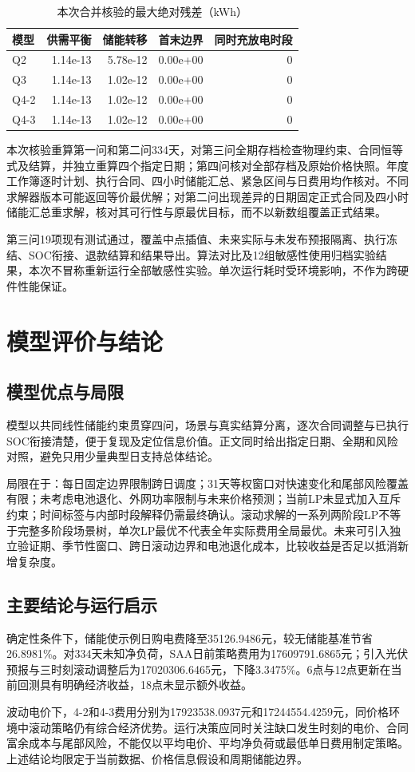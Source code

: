 \begin{table}[H]\centering\small
\caption{本次合并核验的最大绝对残差（kWh）}
\begin{tabular}{lrrrr}\toprule
模型 & 供需平衡 & 储能转移 & 首末边界 & 同时充放电时段\\\midrule
Q2 & 1.14e-13 & 5.78e-12 & 0.00e+00 & 0\\
Q3 & 1.14e-13 & 1.02e-12 & 0.00e+00 & 0\\
Q4-2 & 1.14e-13 & 1.02e-12 & 0.00e+00 & 0\\
Q4-3 & 1.14e-13 & 1.02e-12 & 0.00e+00 & 0\\
\bottomrule\end{tabular}\end{table}
本次核验重算第一问和第二问334天，对第三问全期存档检查物理约束、合同恒等式及结算，并独立重算四个指定日期；第四问核对全部存档及原始价格快照。年度工作簿逐时计划、执行合同、四小时储能汇总、紧急区间与日费用均作核对。不同求解器版本可能返回等价最优解；对第二问出现差异的日期固定正式合同及四小时储能汇总重求解，核对其可行性与原最优目标，而不以新数组覆盖正式结果。

第三问19项现有测试通过，覆盖中点插值、未来实际与未发布预报隔离、执行冻结、SOC衔接、退款结算和结果导出。算法对比及12组敏感性使用归档实验结果\cite{experiment}，本次不冒称重新运行全部敏感性实验。单次运行耗时受环境影响，不作为跨硬件性能保证。

\section{模型评价与结论}
\subsection{模型优点与局限}
模型以共同线性储能约束贯穿四问，场景与真实结算分离，逐次合同调整与已执行SOC衔接清楚，便于复现及定位信息价值。正文同时给出指定日期、全期和风险对照，避免只用少量典型日支持总体结论。

局限在于：每日固定边界限制跨日调度；31天等权窗口对快速变化和尾部风险覆盖有限；未考虑电池退化、外网功率限制与未来价格预测；当前LP未显式加入互斥约束；时间标签与内部时段解释仍需最终确认。滚动求解的一系列两阶段LP不等于完整多阶段场景树，单次LP最优不代表全年实际费用全局最优。未来可引入独立验证期、季节性窗口、跨日滚动边界和电池退化成本，比较收益是否足以抵消新增复杂度。

\subsection{主要结论与运行启示}
确定性条件下，储能使示例日购电费降至35126.9486元，较无储能基准节省26.8981\%。对334天未知净负荷，SAA日前策略费用为17609791.6865元；引入光伏预报与三时刻滚动调整后为17020306.6465元，下降3.3475\%。6点与12点更新在当前回测具有明确经济收益，18点未显示额外收益。

波动电价下，4-2和4-3费用分别为17923538.0937元和17244554.4259元，同价格环境中滚动策略仍有综合经济优势。运行决策应同时关注缺口发生时刻的电价、合同富余成本与尾部风险，不能仅以平均电价、平均净负荷或最低单日费用制定策略。上述结论均限定于当前数据、价格信息假设和周期储能边界。
\FloatBarrier
